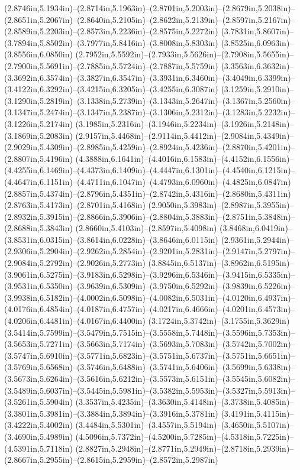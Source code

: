(2.8746in,5.1934in)--(2.8714in,5.1963in)--(2.8701in,5.2003in)--(2.8679in,5.2038in)--(2.8651in,5.2067in)--(2.8640in,5.2105in)--(2.8622in,5.2139in)--(2.8597in,5.2167in)--(2.8589in,5.2203in)--(2.8573in,5.2236in)--(2.8575in,5.2272in) (3.7831in,5.8607in)--(3.7894in,5.8502in)--(3.7977in,5.8416in)--(3.8008in,5.8303in) (3.8525in,6.0963in)--(3.8556in,6.0850in) (2.7952in,5.5592in)--(2.7933in,5.5626in)--(2.7908in,5.5655in)--(2.7900in,5.5691in)--(2.7885in,5.5724in)--(2.7887in,5.5759in) (3.3563in,6.3632in)--(3.3692in,6.3574in)--(3.3827in,6.3547in)--(3.3931in,6.3460in)--(3.4049in,6.3399in)--(3.4122in,6.3292in)--(3.4215in,6.3205in)--(3.4255in,6.3087in) (3.1259in,5.2910in)--(3.1290in,5.2819in)--(3.1338in,5.2739in)--(3.1343in,5.2647in)--(3.1367in,5.2560in)--(3.1347in,5.2474in)--(3.1347in,5.2387in)--(3.1306in,5.2312in)--(3.1283in,5.2232in)--(3.1226in,5.2174in) (3.1985in,5.2316in)--(3.1946in,5.2234in)--(3.1926in,5.2148in)--(3.1869in,5.2083in) (2.9157in,5.4468in)--(2.9114in,5.4412in)--(2.9084in,5.4349in)--(2.9029in,5.4309in)--(2.8985in,5.4259in)--(2.8924in,5.4236in)--(2.8870in,5.4201in)--(2.8807in,5.4196in) (4.3888in,6.1641in)--(4.4016in,6.1583in)--(4.4152in,6.1556in)--(4.4255in,6.1469in)--(4.4373in,6.1409in)--(4.4447in,6.1301in)--(4.4540in,6.1215in)--(4.4647in,6.1151in)--(4.4711in,6.1047in)--(4.4793in,6.0960in)--(4.4825in,6.0847in) (2.8857in,5.4374in)--(2.8796in,5.4351in)--(2.8742in,5.4316in)--(2.8680in,5.4311in) (2.8763in,5.4173in)--(2.8701in,5.4168in) (2.9050in,5.3983in)--(2.8987in,5.3955in)--(2.8932in,5.3915in)--(2.8866in,5.3906in)--(2.8804in,5.3883in)--(2.8751in,5.3848in)--(2.8688in,5.3843in) (2.8660in,5.4103in)--(2.8597in,5.4098in) (3.8468in,6.0419in)--(3.8531in,6.0315in)--(3.8614in,6.0228in)--(3.8646in,6.0115in) (2.9361in,5.2944in)--(2.9306in,5.2904in)--(2.9262in,5.2854in)--(2.9201in,5.2831in)--(2.9147in,5.2797in)--(2.9084in,5.2792in)--(2.9026in,5.2773in) (3.8845in,6.5137in)--(3.8962in,6.5195in)--(3.9061in,6.5275in)--(3.9183in,6.5298in)--(3.9296in,6.5346in)--(3.9415in,6.5335in)--(3.9531in,6.5350in)--(3.9639in,6.5309in)--(3.9750in,6.5292in)--(3.9839in,6.5226in)--(3.9938in,6.5182in)--(4.0002in,6.5098in)--(4.0082in,6.5031in)--(4.0120in,6.4937in)--(4.0176in,6.4854in)--(4.0187in,6.4757in)--(4.0217in,6.4666in)--(4.0201in,6.4573in)--(4.0206in,6.4481in)--(4.0167in,6.4400in) (3.1724in,5.3742in)--(3.1755in,5.3629in) (3.5414in,5.7599in)--(3.5479in,5.7515in)--(3.5558in,5.7448in)--(3.5596in,5.7353in)--(3.5653in,5.7271in)--(3.5663in,5.7174in)--(3.5693in,5.7083in)--(3.5742in,5.7002in)--(3.5747in,5.6910in)--(3.5771in,5.6823in)--(3.5751in,5.6737in)--(3.5751in,5.6651in)--(3.5769in,5.6568in)--(3.5746in,5.6488in)--(3.5741in,5.6406in)--(3.5699in,5.6338in)--(3.5673in,5.6264in)--(3.5616in,5.6212in)--(3.5573in,5.6151in)--(3.5545in,5.6082in)--(3.5489in,5.6037in)--(3.5445in,5.5981in)--(3.5382in,5.5953in)--(3.5327in,5.5913in)--(3.5261in,5.5904in) (3.3537in,5.4235in)--(3.3630in,5.4148in)--(3.3738in,5.4085in)--(3.3801in,5.3981in)--(3.3884in,5.3894in)--(3.3916in,5.3781in) (3.4191in,5.4115in)--(3.4222in,5.4002in) (3.4484in,5.5301in)--(3.4557in,5.5194in)--(3.4650in,5.5107in)--(3.4690in,5.4989in) (4.5096in,5.7372in)--(4.5200in,5.7285in)--(4.5318in,5.7225in)--(4.5391in,5.7118in) (2.8827in,5.2948in)--(2.8771in,5.2949in)--(2.8718in,5.2939in)--(2.8667in,5.2955in)--(2.8615in,5.2959in)--(2.8572in,5.2987in) 